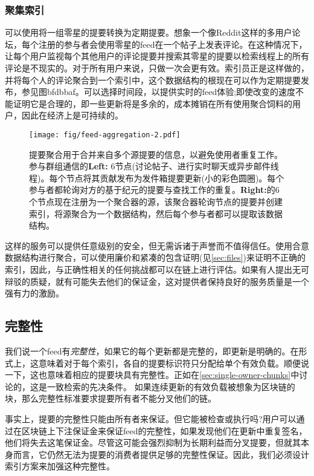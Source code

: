 \subsubsection{聚集索引}

可以使用将一组零星的提要转换为定期提要。想象一个像Reddit这样的多用户论坛，每个注册的参与者会使用零星的feed在一个帖子上发表评论。在这种情况下，让每个用户监视每个其他用户的评论提要并搜索其零星的提要以检索线程上的所有评论是不现实的。对于所有用户来说，只做一次会更有效。索引员正是这样做的，并将每个人的评论聚合到一个索引中，这个数据结构的根现在可以作为定期提要发布，参见图bfdbbaf。可以选择时间段，以提供实时的feed体验;即使改变的速度不能证明它是合理的，即一些更新将是多余的，成本摊销在所有使用聚合饲料的用户，因此在经济上是可持续的。 

\begin{figure}[htbp]
\centering
\texttt{[image: fig/feed-aggregation-2.pdf]}
\caption[提要聚合\statusyellow]{提要聚合用于合并来自多个源提要的信息，以避免使用者重复工作。参与群组通信的\textbf{Left:} 6节点(讨论帖子、进行实时聊天或异步邮件线程)。每个节点将其贡献发布为发件箱提要更新(小的彩色圆圈)。每个参与者都轮询对方的基于纪元的提要与查找工作的重复。\textbf{Right:}的6个节点现在注册为一个聚合器的源，该聚合器轮询节点的提要并创建索引，将源聚合为一个数据结构，然后每个参与者都可以提取该数据结构。}
\label{fig:feed-aggregation}
\end{figure}

这样的服务可以提供任意级别的安全，但无需诉诸于声誉而不值得信任。使用合意数据结构进行聚合，可以使用廉价和紧凑的包含证明(见\ref{sec:files})来证明不正确的索引，因此，与正确性相关的任何挑战都可以在链上进行评估。如果有人提出无可辩驳的质疑，就有可能失去他们的保证金，这对提供者保持良好的服务质量是一个强有力的激励。

\subsection{完整性\statusyellow}\label{sec:feed-integrity}

我们说一个feed有\emph{完整性}，如果它的每个更新都是完整的，即更新是明确的。在形式上，这意味着对于每个索引，各自的提要标识符只分配给单个有效负载。顺便说一下，这也意味着相应的提要块具有完整性。正如在\ref{sec:single-owner-chunks}中讨论的，这是一致检索的先决条件。
如果连续更新的有效负载被想象为区块链的块，那么完整性标准要求提要所有者不能分叉他们的链。

事实上，提要的完整性只能由所有者来保证。但它能被检查或执行吗?用户可以通过在区块链上下注保证金来保证feed的完整性，如果发现他们在更新中重复签名，他们将失去这笔保证金。尽管这可能会强烈抑制为长期利益而分叉提要，但就其本身而言，它仍然无法为提要的消费者提供足够的完整性保证。因此，我们必须设计索引方案来加强这种完整性。

